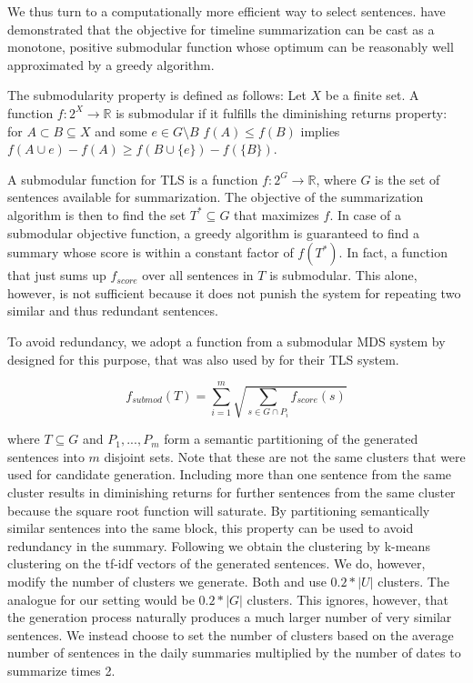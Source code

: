\documentclass[a4paper,BCOR=10mm]{report}
\numberwithin{lemma}{chapter}
\numberwithin{definition}{chapter}
\begin{document}

We thus turn to a computationally more efficient way to select sentences.
\citet{markert} have demonstrated that the objective for timeline summarization can be cast as a monotone, positive submodular function whose optimum can be reasonably well approximated by a greedy algorithm.

The submodularity property is defined as follows:
 Let $X$ be a finite set. A function $f: 2^{X} \rightarrow \mathbb{R}$ is submodular if it fulfills the diminishing returns property: for $A \subset B \subseteq X$ and some $e \in G \setminus B$ $f(A) \leq f(B)$ implies $f(A \cup e) - f(A) \geq f(B \cup \{e\}) - f(\{B\})$.

A submodular function for TLS is a function $f: 2^{G} \rightarrow \mathbb{R}$, where $G$ is the set of sentences available for summarization.
The objective of the summarization algorithm is then to find the set $T^{*} \subseteq G$ that maximizes $f$. In case of a submodular objective function, a greedy algorithm is guaranteed to find a summary whose score is within a constant factor of $f(T^{*})$.
In fact, a function that just sums up $f_{\mathit{score}}$ over all sentences in $T$ is submodular. This alone, however, is not sufficient because it does not punish the system for repeating two similar and thus redundant sentences.

To avoid redundancy, we adopt a function from a submodular MDS system by \citet{lin+bilmes} designed for this purpose, that was also used by \citet{markert} for their TLS system.

\begin{equation}
f_{\mathit{submod}}(T) = \sum_{i = 1}^{m} \sqrt{\sum_{s \in G \cap P_i} f_{\mathit{score}}(s)}
\end{equation}

where $T \subseteq G$ and $P_1, ..., P_m$ form a semantic partitioning of the generated sentences into $m$ disjoint sets. Note that these are not the same clusters that were used for candidate generation. Including more than one sentence from the same cluster results in diminishing returns for further sentences from the same cluster because the square root function will saturate.
By partitioning semantically similar sentences into the same block, this property can be used to avoid redundancy in the summary.
Following \citet{lin+bilmes} we obtain the clustering by k-means clustering on the tf-idf vectors of the generated sentences. We do, however, modify the number of clusters we generate. Both \citet{lin+bilmes} and \citet{markert} use $0.2 * |U|$ clusters. The analogue for our setting would be $0.2 * |G|$ clusters. This ignores, however, that the generation process naturally produces a much larger number of very similar sentences. We instead choose to set the number of clusters based on the average number of sentences in the daily summaries multiplied by the number of dates to summarize times 2.
\end{document}
